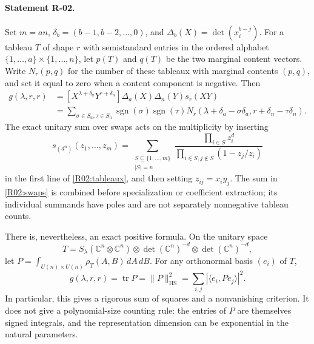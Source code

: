 \documentclass[11pt,a4paper]{article}
\theoremstyle{definition}\newtheorem{definition}{Definition}
\begin{document}
\paragraph{Statement R-02.}
Set $m=an$, $\delta_b=(b-1,b-2,\ldots,0)$, and
$\Delta_b(X)=\det(x_i^{b-j})$. For a tableau $T$ of shape $r$ with
semistandard entries in the ordered alphabet $\{1,\ldots,a\}\times
\{1,\ldots,n\}$, let $p(T)$ and $q(T)$ be the two marginal content vectors.
Write $N_r(p,q)$ for the number of these tableaux with marginal contents
$(p,q)$, and set it equal to zero when a content component is negative.
Then
\begin{align}\label{R02:tableaux}
 g(\lambda,r,r)
 &= [X^{\lambda+\delta_a}Y^{r+\delta_n}]
       \Delta_a(X)\Delta_n(Y)s_r(XY)\\
 &=\sum_{\sigma\in S_a,\tau\in S_n}
    \operatorname{sgn}(\sigma)\operatorname{sgn}(\tau)
    N_r(\lambda+\delta_a-\sigma\delta_a,
        r+\delta_n-\tau\delta_n).\nonumber
\end{align}
The exact unitary sum over swaps acts on the multiplicity by inserting
\begin{equation}\label{R02:swaps}
 s_{(d^n)}(z_1,\ldots,z_m)=
 \sum_{\substack{S\subseteq\{1,\ldots,m\}\\|S|=n}}
 \frac{\prod_{i\in S}z_i^d}
      {\prod_{i\in S,j\notin S}(1-z_j/z_i)}
\end{equation}
in the first line of \eqref{R02:tableaux}, and then setting $z_{ij}=x_i y_j$.
The sum in \eqref{R02:swaps} is combined before specialization or coefficient
extraction; its individual summands have poles and are not separately
nonnegative tableau counts.

There is, nevertheless, an exact positive formula. On the unitary space
\[
 T=S_\lambda(\mathbb C^n\otimes\mathbb C^n)
       \otimes\det(\mathbb C^n)^{-d}\otimes\det(\mathbb C^n)^{-d},
\]
let $P=\int_{U(n)\times U(n)}\rho_T(A,B)\,dA\,dB$. For any orthonormal
basis $(e_i)$ of $T$,
\begin{equation}\label{R02:projector}
 g(\lambda,r,r)=\operatorname{tr}P
   =\|P\|_{\mathrm{HS}}^2=\sum_{i,j}|\langle e_i,Pe_j\rangle|^2.
\end{equation}
In particular, this gives a rigorous sum of squares and a nonvanishing
criterion. It does not give a polynomial-size counting rule: the entries
of $P$ are themselves signed integrals, and the representation dimension
can be exponential in the natural parameters.
\end{document}
